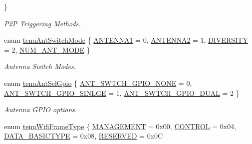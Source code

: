 \begin{DoxyCompactItemize}
 \}\begin{DoxyCompactList}\small\item\em P2P Triggering Methods. \end{DoxyCompactList}
\item 
enum \hyperlink{group__WlanEnums_ga2060d527c27ea7770fea3cd48c55dac6}{tenu\+Ant\+Switch\+Mode} \{ \hyperlink{group__WlanEnums_gga2060d527c27ea7770fea3cd48c55dac6aa6754e22a0f4ac467541cd7907cb0626}{A\+N\+T\+E\+N\+N\+A1} = 0, 
\hyperlink{group__WlanEnums_gga2060d527c27ea7770fea3cd48c55dac6a6729f70205c5448a0283a3d8aed687f5}{A\+N\+T\+E\+N\+N\+A2} = 1, 
\hyperlink{group__WlanEnums_gga2060d527c27ea7770fea3cd48c55dac6a1c1f77450aca53320cb145634136dc86}{D\+I\+V\+E\+R\+S\+I\+TY} = 2, 
\hyperlink{group__WlanEnums_gga2060d527c27ea7770fea3cd48c55dac6ab3415d2364ee12c4bb3833b2e0bacea7}{N\+U\+M\+\_\+\+A\+N\+T\+\_\+\+M\+O\+DE}
 \}\begin{DoxyCompactList}\small\item\em Antenna Switch Modes. \end{DoxyCompactList}
\item 
enum \hyperlink{group__WlanEnums_ga79d8d22335f19b2d3a8cc95b915792ce}{tenu\+Ant\+Sel\+Gpio} \{ \hyperlink{group__WlanEnums_gga79d8d22335f19b2d3a8cc95b915792ceabcded9a7d5db6443c6184c9a92653994}{A\+N\+T\+\_\+\+S\+W\+T\+C\+H\+\_\+\+G\+P\+I\+O\+\_\+\+N\+O\+NE} = 0, 
\hyperlink{group__WlanEnums_gga79d8d22335f19b2d3a8cc95b915792ceae0f68f2bcf97ae62137828b84ffb6980}{A\+N\+T\+\_\+\+S\+W\+T\+C\+H\+\_\+\+G\+P\+I\+O\+\_\+\+S\+I\+N\+L\+GE} = 1, 
\hyperlink{group__WlanEnums_gga79d8d22335f19b2d3a8cc95b915792ceae18544df36cb77b84241a02a906c65b4}{A\+N\+T\+\_\+\+S\+W\+T\+C\+H\+\_\+\+G\+P\+I\+O\+\_\+\+D\+U\+AL} = 2
 \}\begin{DoxyCompactList}\small\item\em Antenna G\+P\+IO options. \end{DoxyCompactList}
\item 
enum \hyperlink{group__WlanEnums_ga593eb9b713b71fcc9cae6e81393b40d9}{tenu\+Wifi\+Frame\+Type} \{ \hyperlink{group__WlanEnums_gga593eb9b713b71fcc9cae6e81393b40d9a6882ae19eda3dcf275595670d49d709e}{M\+A\+N\+A\+G\+E\+M\+E\+NT} = 0x00, 
\hyperlink{group__WlanEnums_gga593eb9b713b71fcc9cae6e81393b40d9af722a5faa36087c914da53ebe4711f08}{C\+O\+N\+T\+R\+OL} = 0x04, 
\hyperlink{group__WlanEnums_gga593eb9b713b71fcc9cae6e81393b40d9a297b5ad5452f3000106b51741f65aee9}{D\+A\+T\+A\+\_\+\+B\+A\+S\+I\+C\+T\+Y\+PE} = 0x08, 
\hyperlink{group__WlanEnums_gga593eb9b713b71fcc9cae6e81393b40d9afe4c21755babfece7188666f75c7386b}{R\+E\+S\+E\+R\+V\+ED} = 0x0C

\end{DoxyCompactItemize}
